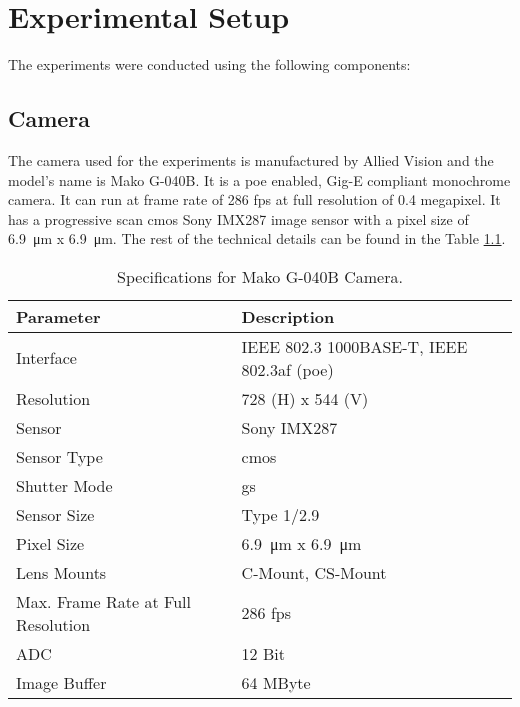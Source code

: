 \chapter{Experimental Setup}

The experiments were conducted using the following components:

\section{Camera}
    The camera used for the experiments is manufactured by Allied Vision and the model's name is Mako G-040B. It is a \gls{poe} enabled, Gig-E compliant monochrome camera. It can run at frame rate of 286 \gls{fps} at full resolution of 0.4 megapixel. It has a progressive scan \gls{cmos} Sony IMX287 image sensor with a pixel size of \SI{6.9}{\micro\meter} x \SI{6.9}{\micro\meter}. The rest of the technical details can be found in the Table \ref{table:camera_specs}.

    \begin{table}[h]
        \centering
        \footnotesize
        \renewcommand{\arraystretch}{1.2}
        \begin{tabular}{p{6cm}p{7cm}}
            \toprule
            \textbf{Parameter} & \textbf{Description} \\
            \midrule
            Interface & IEEE 802.3 1000BASE-T, IEEE 802.3af (\gls{poe})\\
            Resolution & 728 (H) x 544 (V)\\
            Sensor & Sony IMX287\\
            Sensor Type & \gls{cmos}\\
            Shutter Mode & \gls{gs}\\
            Sensor Size & Type 1/2.9\\
            Pixel Size & \SI{6.9}{\micro\meter} x \SI{6.9}{\micro\meter}\\
            Lens Mounts & C-Mount, CS-Mount\\
            Max. Frame Rate at Full Resolution & 286 \gls{fps}\\
            ADC & 12 Bit\\
            Image Buffer & 64 MByte\\
            \bottomrule
        \end{tabular}
        \caption{Specifications for Mako G-040B Camera. \cite{mako_camera}}
        \label{table:camera_specs}
    \end{table}

